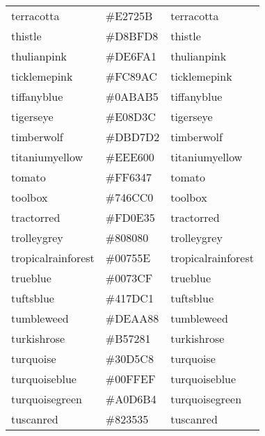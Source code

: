 \documentclass[
]{article}
\begin{document}
\begin{longtable}[]{@{}lll@{}}
terracotta & \colorbox[rgb]{0.89,0.45,0.36}{\#E2725B} &
\textcolor[rgb]{0.89,0.45,0.36}{terracotta            }\tabularnewline
thistle & \colorbox[rgb]{0.85,0.75,0.85}{\#D8BFD8} &
\textcolor[rgb]{0.85,0.75,0.85}{thistle               }\tabularnewline
thulianpink & \colorbox[rgb]{0.87,0.44,0.63}{\#DE6FA1} &
\textcolor[rgb]{0.87,0.44,0.63}{thulianpink           }\tabularnewline
ticklemepink & \colorbox[rgb]{0.99,0.54,0.67}{\#FC89AC} &
\textcolor[rgb]{0.99,0.54,0.67}{ticklemepink          }\tabularnewline
tiffanyblue & \colorbox[rgb]{0.04,0.73,0.71}{\#0ABAB5} &
\textcolor[rgb]{0.04,0.73,0.71}{tiffanyblue           }\tabularnewline
tigerseye & \colorbox[rgb]{0.88,0.55,0.24}{\#E08D3C} &
\textcolor[rgb]{0.88,0.55,0.24}{tigerseye             }\tabularnewline
timberwolf & \colorbox[rgb]{0.86,0.84,0.82}{\#DBD7D2} &
\textcolor[rgb]{0.86,0.84,0.82}{timberwolf            }\tabularnewline
titaniumyellow & \colorbox[rgb]{0.93,0.9,0.0}{\#EEE600} &
\textcolor[rgb]{0.93,0.9,0.0}{titaniumyellow        }\tabularnewline
tomato & \colorbox[rgb]{1.0,0.39,0.28}{\#FF6347} &
\textcolor[rgb]{1.0,0.39,0.28}{tomato                }\tabularnewline
toolbox & \colorbox[rgb]{0.45,0.42,0.75}{\#746CC0} &
\textcolor[rgb]{0.45,0.42,0.75}{toolbox               }\tabularnewline
tractorred & \colorbox[rgb]{0.99,0.05,0.21}{\#FD0E35} &
\textcolor[rgb]{0.99,0.05,0.21}{tractorred            }\tabularnewline
trolleygrey & \colorbox[rgb]{0.5,0.5,0.5}{\#808080} &
\textcolor[rgb]{0.5,0.5,0.5}{trolleygrey           }\tabularnewline
tropicalrainforest & \colorbox[rgb]{0.0,0.46,0.37}{\#00755E} &
\textcolor[rgb]{0.0,0.46,0.37}{tropicalrainforest    }\tabularnewline
trueblue & \colorbox[rgb]{0.0,0.45,0.81}{\#0073CF} &
\textcolor[rgb]{0.0,0.45,0.81}{trueblue              }\tabularnewline
tuftsblue & \colorbox[rgb]{0.28,0.57,0.81}{\#417DC1} &
\textcolor[rgb]{0.28,0.57,0.81}{tuftsblue             }\tabularnewline
tumbleweed & \colorbox[rgb]{0.87,0.67,0.53}{\#DEAA88} &
\textcolor[rgb]{0.87,0.67,0.53}{tumbleweed            }\tabularnewline
turkishrose & \colorbox[rgb]{0.71,0.45,0.51}{\#B57281} &
\textcolor[rgb]{0.71,0.45,0.51}{turkishrose           }\tabularnewline
turquoise & \colorbox[rgb]{0.19,0.84,0.78}{\#30D5C8} &
\textcolor[rgb]{0.19,0.84,0.78}{turquoise             }\tabularnewline
turquoiseblue & \colorbox[rgb]{0.0,1.0,0.94}{\#00FFEF} &
\textcolor[rgb]{0.0,1.0,0.94}{turquoiseblue         }\tabularnewline
turquoisegreen & \colorbox[rgb]{0.63,0.84,0.71}{\#A0D6B4} &
\textcolor[rgb]{0.63,0.84,0.71}{turquoisegreen        }\tabularnewline
tuscanred & \colorbox[rgb]{0.51,0.21,0.21}{\#823535} &
\textcolor[rgb]{0.51,0.21,0.21}{tuscanred             }\tabularnewline

\end{longtable}
\end{document}
